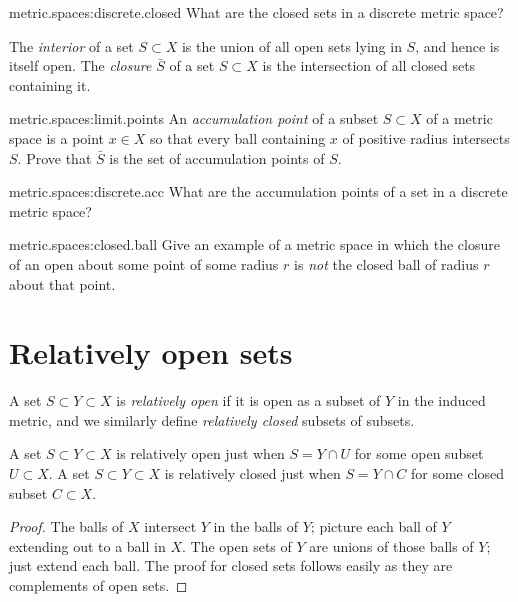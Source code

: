 \begin{problem}{metric.spaces:discrete.closed}
What are the closed sets in a discrete metric space?
\end{problem}
The \emph{interior} of a set \(S \subset X\) is the union of all open sets lying in \(S\), and hence is itself open.
The \emph{closure} \(\bar{S}\) of a set \(S \subset X\) is the intersection of all closed sets containing it.
\begin{problem}{metric.spaces:limit.points}
An \emph{accumulation point} of a subset \(S \subset X\) of a metric space is a point \(x \in X\) so that every ball containing \(x\) of positive radius intersects \(S\).
Prove that \(\bar{S}\) is the set of accumulation points of \(S\).
\end{problem}
\begin{problem}{metric.spaces:discrete.acc}
What are the accumulation points of a set in a discrete metric space?
\end{problem}
\begin{problem}{metric.spaces:closed.ball}
Give an example of a metric space in which the closure of an open about some point of some radius \(r\) is \emph{not} the closed ball of radius \(r\) about that point.
\end{problem}

\section{Relatively open sets}
A set \(S \subset Y \subset X\) is \emph{relatively open} if it is open as a subset of \(Y\) in the induced metric, and we similarly define \emph{relatively closed} subsets of subsets.
\begin{lemma}
A set \(S \subset Y \subset X\) is relatively open just when \(S=Y \cap U\) for some open subset \(U \subset X\).
A set \(S \subset Y \subset X\) is relatively closed just when \(S=Y \cap C\) for some closed subset \(C \subset X\).
\end{lemma}
\begin{proof}
The balls of \(X\) intersect \(Y\) in the balls of \(Y\); picture each ball of \(Y\) extending out to a ball in \(X\).
The open sets of \(Y\) are unions of those balls of \(Y\); just extend each ball.
The proof for closed sets follows easily as they are complements of open sets.
\end{proof}

